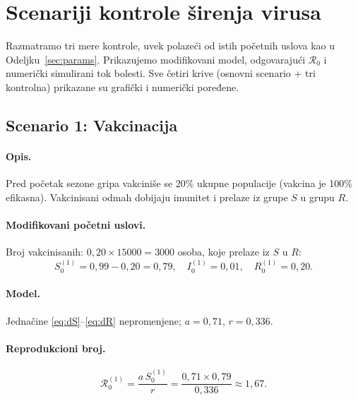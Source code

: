 \documentclass[12pt,a4paper]{article}
\begin{document}
	\section{Scenariji kontrole širenja virusa}
	\label{sec:scenariji}
	
	Razmatramo tri mere kontrole, uvek polazeći od istih početnih uslova kao u Odeljku~\ref{sec:params}.
	Prikazujemo modifikovani model, odgovarajući $\mathcal{R}_0$ i numerički simulirani tok bolesti.
	Sve četiri krive (osnovni scenario + tri kontrolna) prikazane su grafički i numerički poređene.
	
	\subsection{Scenario 1: Vakcinacija}
	
	\paragraph{Opis.}
	Pred početak sezone gripa vakciniše se 20\% ukupne populacije (vakcina je 100\% efikasna).
	Vakcinisani odmah dobijaju imunitet i prelaze iz grupe $S$ u grupu $R$.
	
	\paragraph{Modifikovani početni uslovi.}
	Broj vakcinisanih: $0{,}20\times 15000=3000$ osoba, koje prelaze iz $S$ u $R$:
	\begin{equation}
		S_0^{(1)} = 0{,}99 - 0{,}20 = 0{,}79,\quad
		I_0^{(1)} = 0{,}01,\quad
		R_0^{(1)} = 0{,}20.
	\end{equation}
	
	\paragraph{Model.} Jednačine \eqref{eq:dS}--\eqref{eq:dR} nepromenjene; $a=0{,}71$, $r=0{,}336$.
	
	\paragraph{Reprodukcioni broj.}
	\begin{equation}
		\mathcal{R}_0^{(1)} = \frac{a\,S_0^{(1)}}{r}
		= \frac{0{,}71\times 0{,}79}{0{,}336} \approx 1{,}67.
	\end{equation}
	
\end{document}
